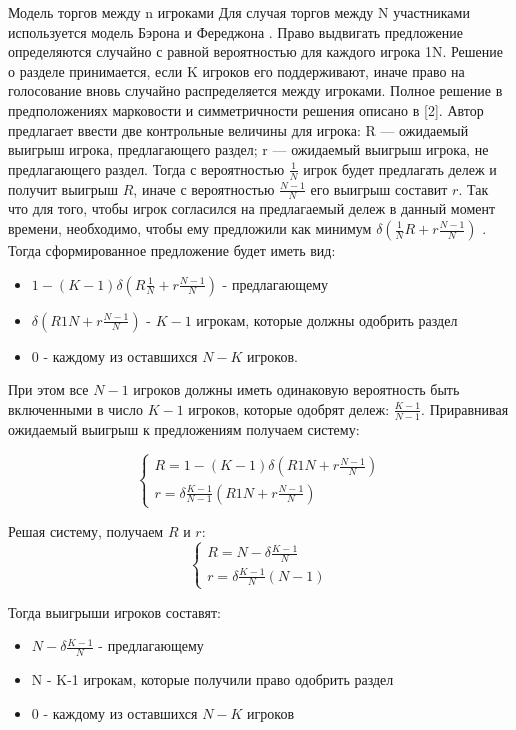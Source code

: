 Модель торгов между n игроками
Для случая торгов между N участниками используется модель Бэрона и Фереджона \cite{baron1989bargaining}. Право выдвигать предложение определяются случайно с равной вероятностью для каждого игрока 1N. Решение о разделе принимается, если K игроков его поддерживают, иначе право на голосование вновь случайно распределяется между игроками.  
Полное решение в предположениях марковости и симметричности решения описано в [2]. Автор предлагает ввести две контрольные величины для игрока: R — ожидаемый выигрыш игрока, предлагающего раздел; r — ожидаемый выигрыш игрока, не предлагающего раздел. Тогда с вероятностью $\frac{1}{N}$ игрок будет предлагать дележ и получит выигрыш $R$, иначе с вероятностью $\frac{N-1}{N}$ его выигрыш составит $r$. Так что для того, чтобы игрок согласился на предлагаемый дележ в данный момент времени, необходимо, чтобы ему предложили как минимум $\delta( \frac{1}{N} R  + r\frac{N-1}{N})$ .
Тогда сформированное предложение будет иметь вид:
\begin{itemize}
    \item $1 - (K - 1)\delta( R \frac{1}{N} + r\frac{N-1}{N} )$ - предлагающему
    \item $\delta( R 1N + r\frac{N-1}{N})$ - $K-1$ игрокам, которые должны одобрить раздел 
    \item $0$ - каждому из оставшихся $N-K$ игроков.
\end{itemize}


При этом все $N-1$ игроков должны иметь одинаковую вероятность быть включенными в число $K-1$ игроков, которые одобрят дележ: $\frac{K-1}{N-1}$. Приравнивая ожидаемый выигрыш к предложениям получаем систему:

\begin{equation}
    \begin{cases}
        R = 1 - (K - 1) \delta ( R 1N + r\frac{N-1}{N} ) \\
        r= \delta \frac{K-1}{N-1}( R 1N + r\frac{N-1}{N} )
    \end{cases}   
\end{equation}


Решая систему, получаем $R$ и $r$:
\begin{equation}
    \begin{cases}
        R = N-\delta \frac{K-1}{N} \\
        r= \delta \frac{K-1}{N}(N-1) 
    \end{cases}   
\end{equation}

Тогда выигрыши игроков составят:
\begin{itemize}
    \item $N-\delta\frac{K-1}{N}$ - предлагающему
    \item N - K-1 игрокам, которые получили право одобрить раздел
    \item $0$ -  каждому из оставшихся $N-K$ игроков 
\end{itemize}


